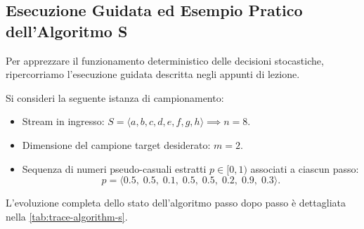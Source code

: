 \FloatBarrier
\subsection{Esecuzione Guidata ed Esempio Pratico dell'Algoritmo S}
Per apprezzare il funzionamento deterministico delle decisioni stocastiche, ripercorriamo l'esecuzione guidata descritta negli appunti di lezione.

\begin{example}
Si consideri la seguente istanza di campionamento:
\begin{itemize}
  \item Stream in ingresso: $S = \langle a, b, c, d, e, f, g, h \rangle \implies n = 8$.
  \item Dimensione del campione target desiderato: $m = 2$.
  \item Sequenza di numeri pseudo-casuali estratti $p \in [0, 1)$ associati a ciascun passo:
  \begin{equation}
    p = \langle 0.5, \; 0.5, \; 0.1, \; 0.5, \; 0.5, \; 0.2, \; 0.9, \; 0.3 \rangle.
  \end{equation}
\end{itemize}

L'evoluzione completa dello stato dell'algoritmo passo dopo passo è dettagliata nella \autoref{tab:trace-algorithm-s}.


\end{example}
